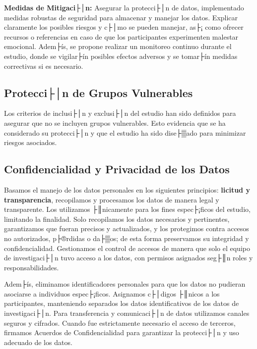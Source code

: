 \textbf{Medidas de Mitigaci├│n:} Asegurar la protecci├│n de datos, implementado medidas robustas de seguridad para almacenar y manejar los datos. Explicar claramente los posibles riesgos y c├│mo se pueden manejar, as├¡ como ofrecer recursos o referencias en caso de que los participantes experimenten malestar emocional. Adem├ís, se propone realizar un monitoreo continuo durante el estudio, donde se vigilar├ín posibles efectos adversos y se tomar├ín medidas correctivas si es necesario.

\subsection{Protecci├│n de Grupos Vulnerables}
\label{subsec:proteccion_grupos_vulnerables}

Los criterios de inclusi├│n y exclusi├│n del estudio han sido definidos para asegurar que no se incluyen grupos vulnerables. Esto evidencia que se ha considerado su protecci├│n y que el estudio ha sido dise├▒ado para minimizar riesgos asociados.

\subsection{Confidencialidad y Privacidad de los Datos}
\label{subsec:confidencialidad_privacidad}

Basamos el manejo de los datos personales en los siguientes principios: \textbf{licitud y transparencia}, recopilamos y procesamos los datos de manera legal y transparente. Los utilizamos ├║nicamente para los fines espec├¡ficos del estudio, limitando la finalidad. Solo recopilamos los datos necesarios y pertinentes, garantizamos que fueran precisos y actualizados, y los protegimos contra accesos no autorizados, p├®rdidas o da├▒os; de esta forma preservamos su integridad y confidencialidad. Gestionamos el control de accesos de manera que solo el equipo de investigaci├│n tuvo acceso a los datos, con permisos asignados seg├║n roles y responsabilidades.

Adem├ís, eliminamos identificadores personales para que los datos no pudieran asociarse a individuos espec├¡ficos. Asignamos c├│digos ├║nicos a los participantes, manteniendo separados los datos identificativos de los datos de investigaci├│n. Para transferencia y comunicaci├│n de datos utilizamos canales seguros y cifrados. Cuando fue estrictamente necesario el acceso de terceros, firmamos Acuerdos de Confidencialidad para garantizar la protecci├│n y uso adecuado de los datos.

